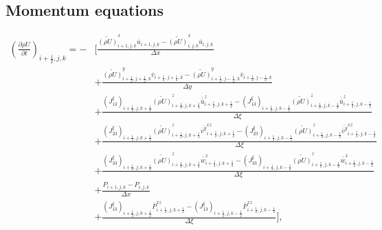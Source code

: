 \subsection{Momentum equations}
\begin{align}
 \left(\frac{\partial \rho U}{\partial t}\right)_{i+\frac{1}{2},j,k}
 = - &\Bigg[ \frac{ \widetilde{(\rho U)}^x_{i+1,j,k} \overline{u}_{i+1,j,k}
                  - \widetilde{(\rho U)}^x_{i  ,j,k} \overline{u}_{i  ,j,k}
                  } {\Delta x} \nonumber \\
          &+ \frac{ \widetilde{(\rho U)}^y_{i+\frac{1}{2},j+\frac{1}{2},k} \overline{v}_{i+\frac{1}{2},j+\frac{1}{2},k}
                  - \widetilde{(\rho U)}^y_{i+\frac{1}{2},j-\frac{1}{2},k} \overline{v}_{i+\frac{1}{2},j-\frac{1}{2},k}
                  } {\Delta y} \nonumber \\
          &+ \frac{ (J^{\xi}_{13})_{i+\frac{1}{2},j,k+\frac{1}{2}} \widetilde{(\rho U)}^z_{i+\frac{1}{2},j,k+\frac{1}{2}} \overline{\overline{u}}^z_{i+\frac{1}{2},j,k+\frac{1}{2}}
                  - (J^{\xi}_{13})_{i+\frac{1}{2},j,k-\frac{1}{2}} \widetilde{(\rho U)}^z_{i+\frac{1}{2},j,k-\frac{1}{2}} \overline{\overline{u}}^z_{i+\frac{1}{2},j,k-\frac{1}{2}}
                  } {\Delta \xi} \nonumber \\
          &+ \frac{ (J^{\xi}_{23})_{i+\frac{1}{2},j,k+\frac{1}{2}} \widetilde{(\rho U)}^z_{i+\frac{1}{2},j,k+\frac{1}{2}} \overline{\overline{v}^y}^{xz}_{i+\frac{1}{2},j,k+\frac{1}{2}}
                  - (J^{\xi}_{23})_{i+\frac{1}{2},j,k-\frac{1}{2}} \widetilde{(\rho U)}^z_{i+\frac{1}{2},j,k-\frac{1}{2}} \overline{\overline{v}^y}^{xz}_{i+\frac{1}{2},j,k-\frac{1}{2}}
                  } {\Delta \xi} \nonumber \\
          &+ \frac{ (J^{\xi}_{33})_{i+\frac{1}{2},j,k+\frac{1}{2}} \widetilde{(\rho U)}^z_{i+\frac{1}{2},j,k+\frac{1}{2}} \overline{\overline{w}}^x_{i+\frac{1}{2},j,k+\frac{1}{2}}
                  - (J^{\xi}_{33})_{i+\frac{1}{2},j,k-\frac{1}{2}} \widetilde{(\rho U)}^z_{i+\frac{1}{2},j,k-\frac{1}{2}} \overline{\overline{w}}^x_{i+\frac{1}{2},j,k-\frac{1}{2}}
                  } {\Delta \xi} \nonumber \\
          &+ \frac{ P_{i+1,j,k}-P_{i,j,k}}{\Delta x} \nonumber \\
          &+ \frac{ (J^{\xi}_{13})_{i+\frac{1}{2},j,k+\frac{1}{2}} \overline{P}^{xz}_{i+\frac{1}{2},j,k+\frac{1}{2}}
                  - (J^{\xi}_{13})_{i+\frac{1}{2},j,k-\frac{1}{2}} \overline{P}^{xz}_{i+\frac{1}{2},j,k-\frac{1}{2}}
                  } {\Delta \xi} \Bigg],
\end{align}

